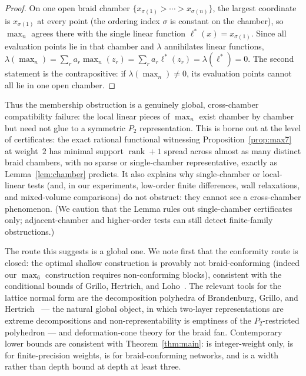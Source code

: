 \documentclass[11pt]{article}
\theoremstyle{definition}
\begin{document}
\begin{proof}
On one open braid chamber $\{x_{\sigma(1)}>\cdots>x_{\sigma(n)}\}$, the largest coordinate is
$x_{\sigma(1)}$ at every point (the ordering index $\sigma$ is constant on the chamber), so $\max_n$ agrees
there with the single linear function $\ell^\ast(x)=x_{\sigma(1)}$. Since all evaluation points lie in that
chamber and $\lambda$ annihilates linear functions,
$\lambda(\max_n)=\sum_r a_r\max_n(z_r)=\sum_r a_r\ell^\ast(z_r)=\lambda(\ell^\ast)=0$. The second statement
is the contrapositive: if $\lambda(\max_n)\ne 0$, its evaluation points cannot all lie in one open chamber.
\end{proof}

Thus the membership obstruction is a genuinely global, cross-chamber compatibility failure: the local
linear pieces of $\max_n$ exist chamber by chamber but need not glue to a symmetric $P_2$ representation.
This is borne out at the level of certificates: the exact rational functional witnessing
Proposition~\ref{prop:max7} at weight~$2$ has minimal support $\operatorname{rank}+1$ spread across almost
as many distinct braid chambers, with no sparse or single-chamber representative, exactly as
Lemma~\ref{lem:chamber} predicts. It also explains why single-chamber or local-linear tests (and, in our
experiments, low-order finite differences, wall relaxations, and mixed-volume comparisons) do not
obstruct: they cannot see a cross-chamber phenomenon. (We caution that the Lemma rules out single-chamber
certificates only; adjacent-chamber and higher-order tests can still detect finite-family obstructions.)

The route this suggests is a global one. We note first that the conformity route is closed: the optimal
shallow construction is provably not braid-conforming (indeed our $\max_6$ construction requires
non-conforming blocks), consistent with the conditional bounds of Grillo, Hertrich, and Loho~\cite{GHL}.
The relevant tools for the lattice normal form are the decomposition polyhedra of Brandenburg, Grillo, and
Hertrich~\cite{BGH} --- the natural global object, in which two-layer representations are extreme
decompositions and non-representability is emptiness of the $P_2$-restricted polyhedron --- and
deformation-cone theory for the braid fan. Contemporary lower bounds are consistent with
Theorem~\ref{thm:main}: \cite{HHL} is integer-weight only, \cite{AHM} is for finite-precision weights,
\cite{GHL} is for braid-conforming networks, and \cite{Saf} is a width rather than depth bound at depth at
least three.
\end{document}
